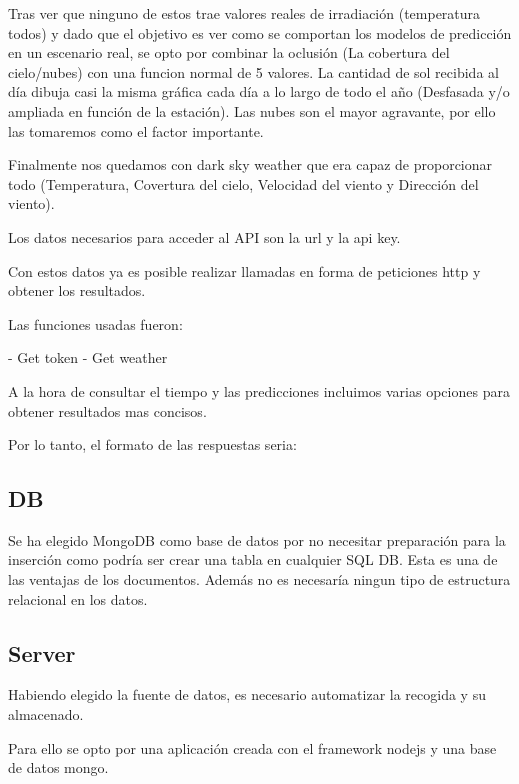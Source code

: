 Tras ver que ninguno de estos trae valores reales de irradiación (temperatura todos) y dado que el objetivo es ver como se comportan los modelos de predicción en un escenario real, se opto por combinar la oclusión (La cobertura del cielo/nubes) con una funcion normal de 5 valores. La cantidad de sol recibida al día dibuja casi la misma gráfica cada día a lo largo de todo el año (Desfasada y/o ampliada en función de la estación). Las nubes son el mayor agravante, por ello las tomaremos como el factor importante. 

Finalmente nos quedamos con dark sky weather que era capaz de proporcionar todo (Temperatura, Covertura del cielo, Velocidad del viento y Dirección del viento).

Los datos necesarios para acceder al API son la url y la api key.

Con estos datos ya es posible realizar llamadas en forma de peticiones http y obtener los resultados.

Las funciones usadas fueron:

- Get token
- Get weather

%

A la hora de consultar el tiempo y las predicciones incluimos varias opciones para obtener resultados mas concisos.

%

Por lo tanto, el formato de las respuestas seria:
%


\subsection{DB} 
\label{sub:DB}

Se ha elegido MongoDB como base de datos por no necesitar preparación para la inserción como podría ser crear una tabla en cualquier SQL DB. Esta es una de las ventajas de los documentos. Además no es necesaría ningun tipo de estructura relacional en los datos.


\subsection{Server} 
\label{sub:server}

Habiendo elegido la fuente de datos, es necesario automatizar la recogida y su almacenado.

Para ello se opto por una aplicación creada con el framework nodejs y una base de datos mongo.


